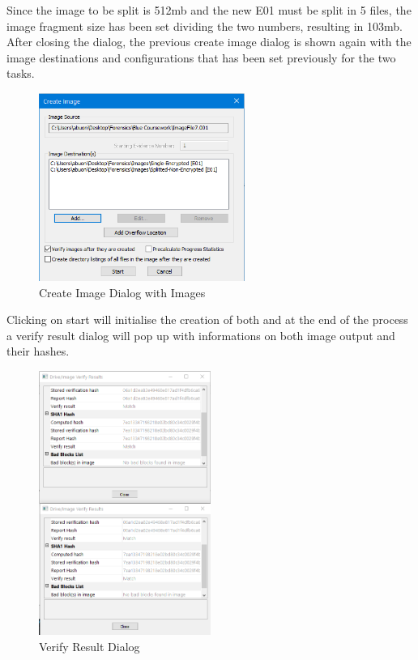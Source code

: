 Since the image to be split is 512mb and the new E01 must be split in 5 files,
the image fragment size has been set dividing the two numbers, resulting in
103mb. After closing the dialog, the previous create image dialog is shown again
with the image destinations and configurations that has been set previously for
the two tasks.

\begin{figure}[H]
  \centering
  \includegraphics[width=0.6\textwidth]{figures/create-image-start}
  \caption{Create Image Dialog with Images}
  \label{f:create-image-start}
\end{figure}

Clicking on start will initialise the creation of both and at the end of the
process a verify result dialog will pop up with informations on both image
output and their hashes.

\begin{figure}[H]
  \centering
  \includegraphics[width=0.5\textwidth]{figures/end-process-hashes}
  \caption{Verify Result Dialog}
  \label{f:end-process-hashes}
\end{figure}

